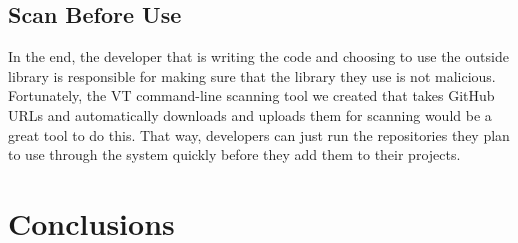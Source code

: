 \documentclass[]{acmart}
\begin{document}
\subsection{Scan Before Use}
In the end, the developer that is writing the code and choosing to use the outside library is responsible for making sure that the library they use is not malicious. Fortunately, the VT command-line scanning tool we created that takes GitHub URLs and automatically downloads and uploads them for scanning would be a great tool to do this. That way, developers can just run the repositories they plan to use through the system quickly before they add them to their projects.
\section{Conclusions}
\end{document}
